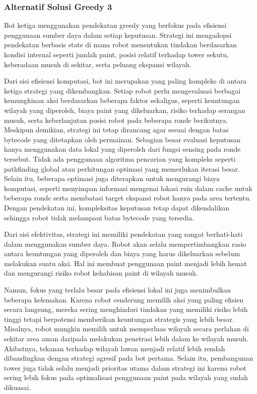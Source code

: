 \documentclass{article}
\begin{document}
\subsubsection{Alternatif Solusi Greedy 3}

Bot ketiga menggunakan pendekatan greedy yang berfokus pada efisiensi penggunaan sumber daya dalam 
setiap keputusan. Strategi ini mengadopsi pendekatan berbasis state di mana robot menentukan tindakan 
berdasarkan kondisi internal seperti jumlah paint, posisi relatif terhadap tower sekutu, keberadaan musuh 
di sekitar, serta peluang ekspansi wilayah.

Dari sisi efisiensi komputasi, bot ini merupakan yang paling kompleks di antara ketiga strategi yang 
dikembangkan. Setiap robot perlu mengevaluasi berbagai kemungkinan aksi berdasarkan beberapa faktor 
sekaligus, seperti keuntungan wilayah yang diperoleh, biaya paint yang dikeluarkan, risiko terhadap 
serangan musuh, serta keberlanjutan posisi robot pada beberapa ronde berikutnya. Meskipun demikian, 
strategi ini tetap dirancang agar sesuai dengan batas bytecode yang ditetapkan oleh permainan. Sebagian 
besar evaluasi keputusan hanya menggunakan data lokal yang diperoleh dari fungsi sensing pada ronde 
tersebut. Tidak ada penggunaan algoritma pencarian yang kompleks seperti pathfinding global atau 
perhitungan optimasi yang memerlukan iterasi besar. Selain itu, beberapa optimasi juga diterapkan untuk 
mengurangi biaya komputasi, seperti menyimpan informasi mengenai lokasi ruin dalam cache untuk 
beberapa ronde serta membatasi target ekspansi robot hanya pada area tertentu. Dengan pendekatan ini, 
kompleksitas keputusan tetap dapat dikendalikan sehingga robot tidak melampaui batas bytecode yang 
tersedia.

Dari sisi efektivitas, strategi ini memiliki pendekatan yang sangat berhati-hati dalam menggunakan 
sumber daya. Robot akan selalu mempertimbangkan rasio antara keuntungan yang diperoleh dan biaya 
yang harus dikeluarkan sebelum melakukan suatu aksi. Hal ini membuat penggunaan paint menjadi lebih 
hemat dan mengurangi risiko robot kehabisan paint di wilayah musuh.

Namun, fokus yang terlalu besar pada efisiensi lokal ini juga menimbulkan beberapa kelemahan. Karena 
robot cenderung memilih aksi yang paling efisien secara langsung, mereka sering menghindari tindakan 
yang memiliki risiko lebih tinggi tetapi berpotensi memberikan keuntungan strategis yang lebih besar. 
Misalnya, robot mungkin memilih untuk memperluas wilayah secara perlahan di sekitar area aman 
daripada melakukan penetrasi lebih dalam ke wilayah musuh. Akibatnya, tekanan terhadap wilayah lawan 
menjadi relatif lebih rendah dibandingkan dengan strategi agresif pada bot pertama. Selain itu, 
pembangunan tower juga tidak selalu menjadi prioritas utama dalam strategi ini karena robot sering lebih 
fokus pada optimalisasi penggunaan paint pada wilayah yang sudah dikuasai.
\end{document}
